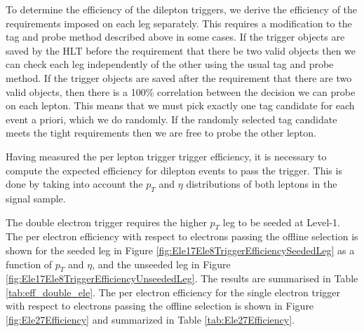  
To determine the efficiency of the dilepton triggers, 
we derive the efficiency of the requirements imposed on each leg separately.
This requires a modification to the tag and probe method described above in some cases.
If the trigger objects are saved by the HLT before the requirement that there be two valid objects then
we can check each leg independently of the other using the usual tag and probe method.
If the trigger objects are saved after the requirement that there are two valid objects, then there is 
a 100\% correlation between the decision we can probe on each lepton.
This means that we must pick exactly one tag candidate for each event a priori, which we do 
randomly. 
If the randomly selected tag candidate meets the tight requirements then we are free to 
probe the other lepton.

Having measured the per lepton trigger trigger efficiency,
it is necessary to compute the expected efficiency for dilepton events to pass the trigger.
This is done by taking into account the $p_{T}$ and $\eta$ distributions
of both leptons in the signal sample.

The double electron trigger requires the higher $p_T$ leg to be seeded at Level-1.
The per electron efficiency with respect to electrons passing the offline selection
is shown for the seeded leg in  
Figure \ref{fig:Ele17Ele8TriggerEfficiencySeededLeg} as a function of $p_{T}$ and $\eta$, 
and the unseeded leg in Figure \ref{fig:Ele17Ele8TriggerEfficiencyUnseededLeg}.
The results are summarised in Table \ref{tab:eff_double_ele}. 
The per electron efficiency for the
single electron trigger with respect to electrons passing the offline selection
is shown in Figure \ref{fig:Ele27Efficiency} and summarized
in Table \ref{tab:Ele27Efficiency}.

